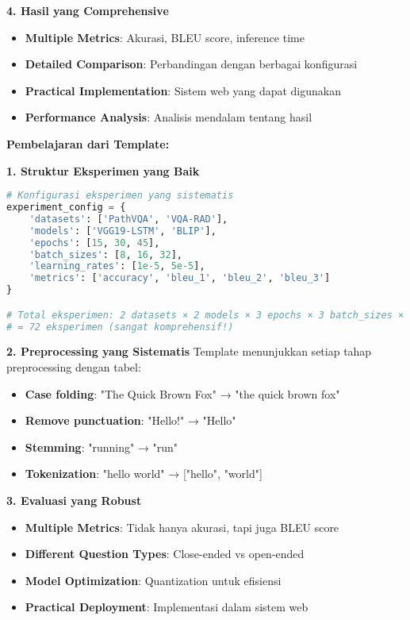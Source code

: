 \textbf{4. Hasil yang Comprehensive}
\begin{itemize}
    \item \textbf{Multiple Metrics}: Akurasi, BLEU score, inference time
    \item \textbf{Detailed Comparison}: Perbandingan dengan berbagai konfigurasi
    \item \textbf{Practical Implementation}: Sistem web yang dapat digunakan
    \item \textbf{Performance Analysis}: Analisis mendalam tentang hasil
\end{itemize}

\textbf{Pembelajaran dari Template:}

\textbf{1. Struktur Eksperimen yang Baik}
\begin{lstlisting}[language=python, style=python, caption=Struktur Eksperimen dari Template]
# Konfigurasi eksperimen yang sistematis
experiment_config = {
    'datasets': ['PathVQA', 'VQA-RAD'],
    'models': ['VGG19-LSTM', 'BLIP'],
    'epochs': [15, 30, 45],
    'batch_sizes': [8, 16, 32],
    'learning_rates': [1e-5, 5e-5],
    'metrics': ['accuracy', 'bleu_1', 'bleu_2', 'bleu_3']
}

# Total eksperimen: 2 datasets × 2 models × 3 epochs × 3 batch_sizes × 2 lr
# = 72 eksperimen (sangat komprehensif!)
\end{lstlisting}

\textbf{2. Preprocessing yang Sistematis}
Template menunjukkan setiap tahap preprocessing dengan tabel:
\begin{itemize}
    \item \textbf{Case folding}: "The Quick Brown Fox" → "the quick brown fox"
    \item \textbf{Remove punctuation}: "Hello!" → "Hello"
    \item \textbf{Stemming}: "running" → "run"
    \item \textbf{Tokenization}: "hello world" → ["hello", "world"]
\end{itemize}

\textbf{3. Evaluasi yang Robust}
\begin{itemize}
    \item \textbf{Multiple Metrics}: Tidak hanya akurasi, tapi juga BLEU score
    \item \textbf{Different Question Types}: Close-ended vs open-ended
    \item \textbf{Model Optimization}: Quantization untuk efisiensi
    \item \textbf{Practical Deployment}: Implementasi dalam sistem web
\end{itemize}


